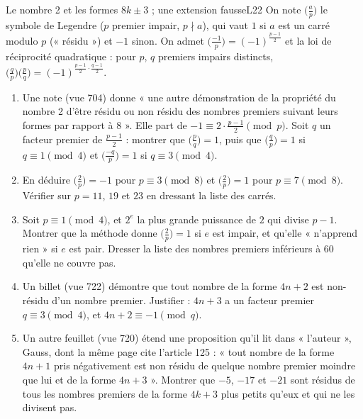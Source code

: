 \documentclass[11pt,a4paper]{article}
\begin{document}
\begin{exercice}{Le nombre 2 et les formes $8k \pm 3$ ; une extension fausse}{L2}{2}
On note $\bigl(\frac ap\bigr)$ le symbole de Legendre ($p$ premier impair, $p \nmid a$),
qui vaut $1$ si $a$ est un carré modulo $p$ (« résidu ») et $-1$ sinon. On admet
$\bigl(\frac{-1}{p}\bigr) = (-1)^{\frac{p-1}{2}}$ et la loi de réciprocité quadratique :
pour $p$, $q$ premiers impairs distincts,
$\bigl(\frac qp\bigr)\bigl(\frac pq\bigr) = (-1)^{\frac{p-1}{2}\cdot\frac{q-1}{2}}$.
\begin{enumerate}
\item Une note (vue 704) donne « une autre démonstration de la propriété du nombre 2
  d'être résidu ou non résidu des nombres premiers suivant leurs formes par rapport à
  8 ». Elle part de $-1 \equiv 2\cdot\frac{p-1}{2} \pmod p$. Soit $q$ un facteur premier
  de $\frac{p-1}{2}$ : montrer que $\bigl(\frac pq\bigr) = 1$, puis que
  $\bigl(\frac qp\bigr) = 1$ si $q \equiv 1 \pmod 4$ et $\bigl(\frac{-q}{p}\bigr) = 1$ si
  $q \equiv 3 \pmod 4$.
\item En déduire $\bigl(\frac2p\bigr) = -1$ pour $p \equiv 3 \pmod 8$ et
  $\bigl(\frac2p\bigr) = 1$ pour $p \equiv 7 \pmod 8$. Vérifier sur $p = 11$, $19$ et
  $23$ en dressant la liste des carrés.
\item Soit $p \equiv 1 \pmod 4$, et $2^e$ la plus grande puissance de $2$ qui divise
  $p - 1$. Montrer que la méthode donne $\bigl(\frac2p\bigr) = 1$ si $e$ est impair, et
  qu'elle « n'apprend rien » si $e$ est pair. Dresser la liste des nombres premiers
  inférieurs à $60$ qu'elle ne couvre pas.
\item Un billet (vue 722) démontre que tout nombre de la forme $4n+2$ est non-résidu
  d'un nombre premier. Justifier : $4n + 3$ a un facteur premier $q \equiv 3 \pmod 4$,
  et $4n + 2 \equiv -1 \pmod q$.
\item Un autre feuillet (vue 720) étend une proposition qu'il lit dans « l'auteur »,
  Gauss, dont la même page cite l'article 125 :
  « tout nombre de la forme $4n+1$ pris négativement est non résidu de quelque nombre
  premier moindre que lui et de la forme $4n+3$ ». Montrer que $-5$, $-17$ et $-21$
  sont résidus de tous les nombres premiers de la forme $4k+3$ plus petits qu'eux et
  qui ne les divisent pas.
\end{enumerate}
\end{exercice}
\end{document}
